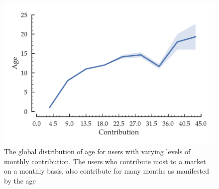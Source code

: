 \begin{figure}[hbt]
\centering
\includegraphics[scale=0.5]{Figures/Age_vs_Contribution.pdf}
\caption{The global distribution of age for users with varying levels of monthly contribution. The users who contribute most to a market on a monthly basis, also contribute for many months as manifested by the age}
\label{fig:age_vs_contribution}
\end{figure}


